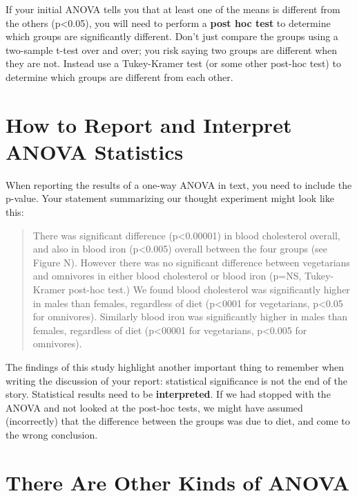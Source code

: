 \documentclass[
]{book}
\begin{document}
If your initial ANOVA tells you that at least one of the means is different from the others (p\textless0.05), you will need to perform a \textbf{post hoc test} to determine which groups are significantly different. Don't just compare the groups using a two-sample t-test over and over; you risk saying two groups are different when they are not. Instead use a Tukey-Kramer test (or some other post-hoc test) to determine which groups are different from each other.

\hypertarget{how-to-report-and-interpret-anova-statistics}{%
\section{How to Report and Interpret ANOVA Statistics}\label{how-to-report-and-interpret-anova-statistics}}

When reporting the results of a one-way ANOVA in text, you need to include the p-value. Your statement summarizing our thought experiment might look like this:

\begin{quote}
There was significant difference (p\textless0.00001) in blood cholesterol overall, and also in blood iron (p\textless0.005) overall between the four groups (see Figure N). However there was no significant difference between vegetarians and omnivores in either blood cholesterol or blood iron (p=NS, Tukey-Kramer post-hoc test.) We found blood cholesterol was significantly higher in males than females, regardless of diet (p\textless0001 for vegetarians, p\textless0.05 for omnivores). Similarly blood iron was significantly higher in males than females, regardless of diet (p\textless00001 for vegetarians, p\textless0.005 for omnivores).
\end{quote}

The findings of this study highlight another important thing to remember when writing the discussion of your report: statistical significance is not the end of the story. Statistical results need to be \textbf{interpreted}. If we had stopped with the ANOVA and not looked at the post-hoc tests, we might have assumed (incorrectly) that the difference between the groups was due to diet, and come to the wrong conclusion.

\hypertarget{there-are-other-kinds-of-anova}{%
\section{There Are Other Kinds of ANOVA}\label{there-are-other-kinds-of-anova}}
\end{document}
